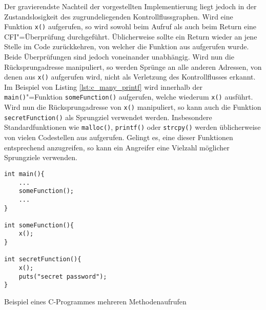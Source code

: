 Der gravierendste Nachteil der vorgestellten Implementierung liegt jedoch in der Zustandslosigkeit des zugrundeliegenden Kontrollflussgraphen. Wird eine Funktion \texttt{x()} aufgerufen, so wird sowohl beim Aufruf als auch beim Return eine CFI"=Überprüfung durchgeführt. Üblicherweise sollte ein Return wieder an jene Stelle im Code zurückkehren, von welcher die Funktion aus aufgerufen wurde. Beide Überprüfungen sind jedoch voneinander unabhängig. Wird nun die Rücksprungadresse manipuliert, so werden Sprünge an alle anderen Adressen, von denen aus \texttt{x()} aufgerufen wird, nicht als Verletzung des Kontrollflusses erkannt. Im Beispiel von Listing \ref{lst:c_many_printf} wird innerhalb der \texttt{main()}"=Funktion \texttt{someFunction()} aufgerufen, welche wiederum \texttt{x()} ausführt. Wird nun die Rücksprungadresse von \texttt{x()} manipuliert, so kann auch die Funktion \texttt{secretFunction()} als Sprungziel verwendet werden. Insbesondere Standardfunktionen wie \texttt{malloc()}, \texttt{printf()} oder \texttt{strcpy()} werden üblicherweise von vielen Codestellen aus aufgerufen. Gelingt es, eine dieser Funktionen entsprechend anzugreifen, so kann ein Angreifer eine Vielzahl möglicher Sprungziele verwenden.


\begin{listing}[htbp!]
\begin{verbatim}
int main(){
	...
	someFunction();
	...
}

int someFunction(){
	x();
}

int secretFunction(){
	x();
	puts("secret password");
}
\end{verbatim}
\caption{Beispiel eines C-Programmes mehreren Methodenaufrufen}
\label{lst:c_many_printf}
\end{listing}

